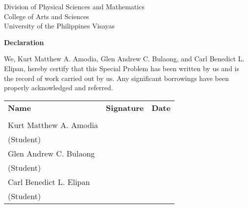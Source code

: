 \begin{center}
	Division of Physical Sciences and Mathematics\\
	College of Arts and Sciences\\
	University of the Philippines Visayas 
	
		\textbf{Declaration}
		\end{center}

We,  Kurt Matthew A. Amodia, Glen Andrew C. Bulaong, and Carl Benedict L. Elipan, hereby certify that this Special Problem has been written by us  and is the record of work carried out by us. Any significant borrowings have been properly acknowledged and referred.

	\begin{tabular}{lll}
	\bfseries Name  & \bfseries Signature & \bfseries Date\\ \\
	Kurt Matthew A. Amodia &\signaturerule  & \signaturerule\\ 
	\multicolumn{1}{l}{(Student)} \\ 
	Glen Andrew C. Bulaong &\signaturerule  & \signaturerule\\ 
	\multicolumn{1}{l}{(Student)} \\
	Carl Benedict L. Elipan &\signaturerule  & \signaturerule\\ 
\multicolumn{1}{l}{(Student)} \\

\end{tabular}



